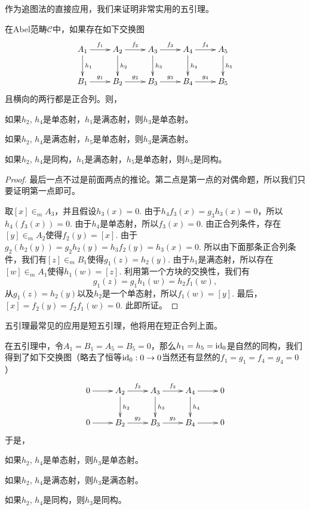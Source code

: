 作为追图法的直接应用，我们来证明非常实用的五引理。

\begin{lem}[五引理]\label{5-lem}
在Abel范畴$\mathcal{C}$中，如果存在如下交换图
\[
	\xymatrix{
	A_1\ar[r]^{f_1}\ar[d]^{h_1}&A_2\ar[r]^{f_2}\ar[d]^{h_2}&A_3\ar[r]^{f_3}\ar[d]^{h_3}&A_4\ar[r]^{f_4}\ar[d]^{h_4}&A_5\ar[d]^{h_5}\\
	B_1\ar[r]^{g_1}&B_2\ar[r]^{g_2}&B_3\ar[r]^{g_3}&B_4\ar[r]^{g_4}&B_5\\
	}
\]
且横向的两行都是正合列。则，
\begin{compactenum}[~~~(1)]
\item 如果$h_2$, $h_4$是单态射，$h_1$是满态射，则$h_3$是单态射。
\item 如果$h_2$, $h_4$是满态射，$h_5$是单态射，则$h_3$是满态射。
\item 如果$h_2$, $h_4$是同构，$h_1$是满态射，$h_5$是单态射，则$h_3$是同构。
\end{compactenum}
\end{lem}

\begin{proof}
最后一点不过是前面两点的推论。第二点是第一点的对偶命题，所以我们只要证明第一点即可。

取$[x]\in_m A_3$，并且假设$h_3(x)=0$. 由于$h_4f_3(x)=g_3h_3(x)=0$，所以$h_4(f_3(x))=0$. 由于$h_4$是单态射，所以$f_3(x)=0$. 由正合列条件，存在$[y]\in_m A_2$使得$f_2(y)=[x]$. 由于$g_2(h_2(y))=g_2h_2(y)=h_3f_2(y)=h_3(x)=0$. 所以由下面那条正合列条件，我们有$[z]\in_m B_1$使得$g_1(z)=h_2(y)$. 由于$h_1$是满态射，所以存在$[w]\in_m A_1$使得$h_1(w)=[z]$. 利用第一个方块的交换性，我们有
\[
	g_1(z)=g_1h_1(w)=h_2f_1(w),
\]
从$g_1(z)=h_2(y)$以及$h_2$是一个单态射，所以$f_1(w)=[y]$. 最后，$[x]=f_2(y)=f_2f_1(w)=0$. 此即所证。
\end{proof}

五引理最常见的应用是短五引理，他将用在短正合列上面。

\begin{lem}[短五引理]\label{short-5-lem}
在五引理中，令$A_1=B_1=A_5=B_5=0$，那么$h_1=h_5=\operatorname{id}_0$是自然的同构，我们得到了如下交换图（略去了恒等$\operatorname{id}_0:0\to 0$当然还有显然的$f_1=g_1=f_4=g_4=0$）
\[
	\xymatrix{
	0\ar[r]&A_2\ar[r]^{f_2}\ar[d]^{h_2}&A_3\ar[r]^{f_3}\ar[d]^{h_3}&A_4\ar[r]\ar[d]^{h_4}&0\\
	0\ar[r]&B_2\ar[r]^{g_2}&B_3\ar[r]^{g_3}&B_4\ar[r]&0\\
	}
\]
于是，
\begin{compactenum}[~~~(1)]
\item 如果$h_2$, $h_4$是单态射，则$h_3$是单态射。
\item 如果$h_2$, $h_4$是满态射，则$h_3$是满态射。
\item 如果$h_2$, $h_4$是同构，则$h_3$是同构。
\end{compactenum}
\end{lem}

